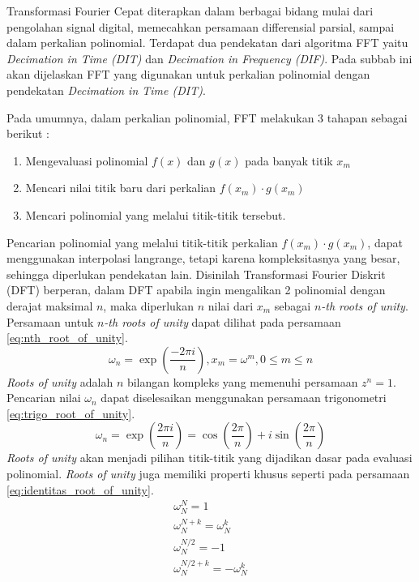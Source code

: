 Transformasi Fourier Cepat diterapkan dalam berbagai bidang mulai dari pengolahan signal digital, memecahkan persamaan differensial parsial, sampai dalam perkalian polinomial. Terdapat dua pendekatan dari algoritma FFT yaitu \textit{Decimation in Time (DIT)} dan \textit{Decimation in Frequency (DIF)}. Pada subbab ini akan dijelaskan FFT yang digunakan untuk perkalian polinomial dengan pendekatan \textit{Decimation in Time (DIT)}.

Pada umumnya, dalam perkalian polinomial, FFT melakukan 3 tahapan sebagai berikut :
\begin{enumerate}
	\item Mengevaluasi polinomial $ f(x) $ dan $ g(x) $ pada banyak titik $ x_m $
	\item Mencari nilai titik baru dari perkalian $ f(x_m) \cdot g(x_m) $
	\item Mencari polinomial yang melalui titik-titik tersebut.
\end{enumerate}
Pencarian polinomial yang melalui titik-titik perkalian $ f(x_m) \cdot g(x_m) $, dapat menggunakan interpolasi langrange, tetapi karena kompleksitasnya yang besar, sehingga diperlukan pendekatan lain. Disinilah Transformasi Fourier Diskrit (DFT) berperan, dalam DFT apabila ingin mengalikan 2 polinomial dengan derajat maksimal $ n $, maka diperlukan $ n $ nilai dari $ x_m $ sebagai $n$\textit{-th roots of unity}. Persamaan untuk $n$\textit{-th roots of unity} dapat dilihat pada persamaan \eqref{eq:nth_root_of_unity}.
\begin{equation}
	\omega_n = \exp(\frac{-2\pi i}{n}) , x_m = \omega^m, 0 \leq m \leq n
	\label{eq:nth_root_of_unity}
\end{equation}
\textit{Roots of unity} adalah $ n $ bilangan kompleks yang memenuhi persamaan $ z^{n} = 1 $. Pencarian nilai $ \omega_n $ dapat diselesaikan menggunakan persamaan trigonometri \eqref{eq:trigo_root_of_unity}.
\begin{equation}
	\omega_n = \exp(\frac{2\pi i}{n}) = \cos(\frac{2\pi}{n}) + i \sin(\frac{2\pi}{n})
	\label{eq:trigo_root_of_unity}
\end{equation}
\textit{Roots of unity} akan menjadi pilihan titik-titik yang dijadikan dasar pada evaluasi polinomial. \textit{Roots of unity} juga memiliki properti khusus seperti pada persamaan \eqref{eq:identitas_root_of_unity}.
\begin{equation}
	\begin{aligned}
		\omega_{N}^{N} = 1 \\
		\omega_{N}^{N+k} = \omega_{N}^{k} \\
		\omega_{N}^{N/2} = -1 \\
		\omega_{N}^{N/2+k} = -\omega_{N}^{k} \\
	\end{aligned}
	\label{eq:identitas_root_of_unity}
\end{equation}

